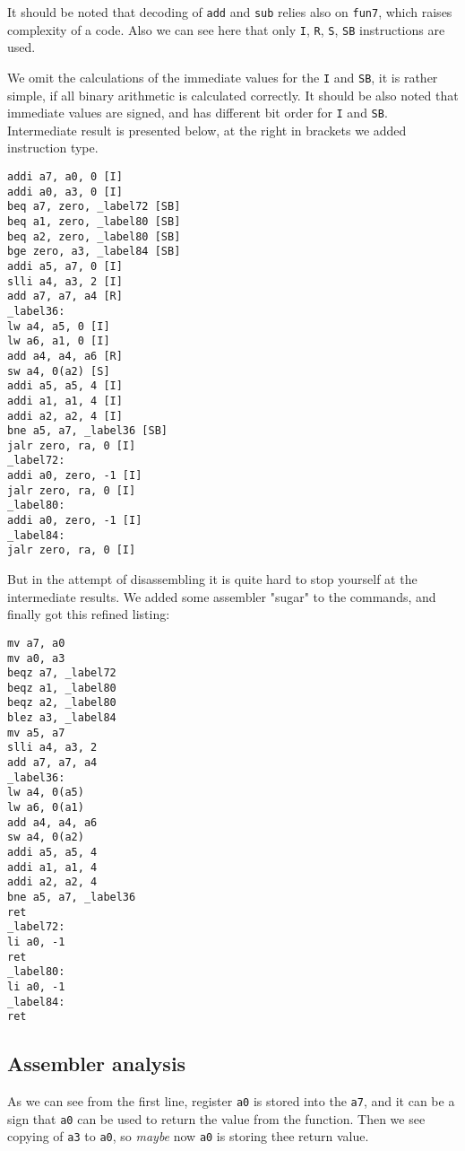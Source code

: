 \documentclass[a4paper]{article}
\begin{document}
It should be noted that decoding of \texttt{add} and \texttt{sub} relies also on \texttt{fun7}, which raises complexity of a code. Also we can see here that only \texttt{I}, \texttt{R}, \texttt{S}, \texttt{SB} instructions are used.

We omit the calculations of the immediate values for the \texttt{I} and \texttt{SB}, it is rather simple, if all binary arithmetic is calculated correctly. It should be also noted that immediate values are signed, and has different bit order for \texttt{I} and \texttt{SB}. Intermediate result is presented below, at the right in brackets we added instruction type.  

\begin{lstlisting}[language={[x86masm]Assembler}, caption=Assembler instructions]
addi a7, a0, 0 [I]
addi a0, a3, 0 [I]
beq a7, zero, _label72 [SB]
beq a1, zero, _label80 [SB]
beq a2, zero, _label80 [SB]
bge zero, a3, _label84 [SB]
addi a5, a7, 0 [I]
slli a4, a3, 2 [I]
add a7, a7, a4 [R]
_label36:
lw a4, a5, 0 [I]
lw a6, a1, 0 [I]
add a4, a4, a6 [R]
sw a4, 0(a2) [S]
addi a5, a5, 4 [I]
addi a1, a1, 4 [I]
addi a2, a2, 4 [I]
bne a5, a7, _label36 [SB]
jalr zero, ra, 0 [I]
_label72:
addi a0, zero, -1 [I]
jalr zero, ra, 0 [I]
_label80:
addi a0, zero, -1 [I]
_label84:
jalr zero, ra, 0 [I]

\end{lstlisting}

But in the attempt of disassembling it is quite hard to stop yourself at the intermediate results. We added some assembler "sugar" to the commands, and finally got this refined listing:

\begin{lstlisting}[language={[x86masm]Assembler}, caption=Refined assembler instructions]
mv a7, a0
mv a0, a3
beqz a7, _label72
beqz a1, _label80
beqz a2, _label80
blez a3, _label84
mv a5, a7
slli a4, a3, 2
add a7, a7, a4
_label36:
lw a4, 0(a5)
lw a6, 0(a1)
add a4, a4, a6
sw a4, 0(a2)
addi a5, a5, 4
addi a1, a1, 4
addi a2, a2, 4
bne a5, a7, _label36
ret
_label72:
li a0, -1
ret
_label80:
li a0, -1
_label84:
ret
\end{lstlisting}

\subsection{Assembler analysis}
As we can see from the first line, register \texttt{a0} is stored into the \texttt{a7}, and it can be a sign that \texttt{a0} can be used to return the value from the function.
Then we see copying of \texttt{a3} to \texttt{a0}, so \textit{maybe} now \texttt{a0} is storing thee return value.
\end{document}
